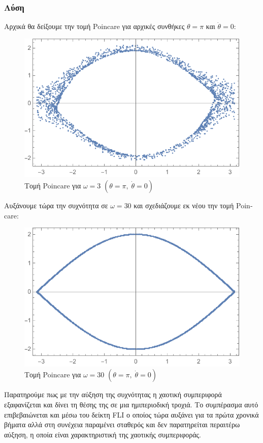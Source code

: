 \documentclass{article}
\begin{document}
\subsubsection{Λύση}

\indent Αρχικά θα δείξουμε την τομή \textlatin{Poincare} για αρχικές συνθήκες \(\theta=\pi\) και \(\dot{\theta}=0\):

\begin{figure}[H]
    \centering
    \includegraphics{AD_Pend_4/poincare_pi_initial.pdf}
    \caption{Τομή \textlatin{Poincare} για \(\omega=3\) \((\theta=\pi,\;\dot{\theta}=0)\)}
    \label{fig:initial_poincare}
\end{figure}

Αυξάνουμε τώρα την συχνότητα σε \(\omega=30\) και σχεδιάζουμε εκ νέου την τομή \textlatin{Poincare}:

\begin{figure}[H]
    \centering
    \includegraphics{AD_Pend_4/poincare_pi_final.pdf}
    \caption{Τομή \textlatin{Poincare} για \(\omega=30\) \((\theta=\pi,\;\dot{\theta}=0) \) }
    \label{fig:final_poincare}
\end{figure}

Παρατηρούμε πως με την αύξηση της συχνότητας η χαοτική συμπεριφορά εξαφανίζεται και δίνει τη θέσης της σε μια ημιπεριοδική τροχιά. Το συμπέρασμα αυτό επιβεβαιώνεται και μέσω του δείκτη \textlatin{FLI} ο οποίος τώρα αυξάνει για τα πρώτα χρονικά βήματα αλλά στη συνέχεια παραμένει σταθερός και δεν παρατηρείται περαιτέρω αύξηση, η οποία είναι χαρακτηριστική της χαοτικής συμπεριφοράς.
\end{document}
